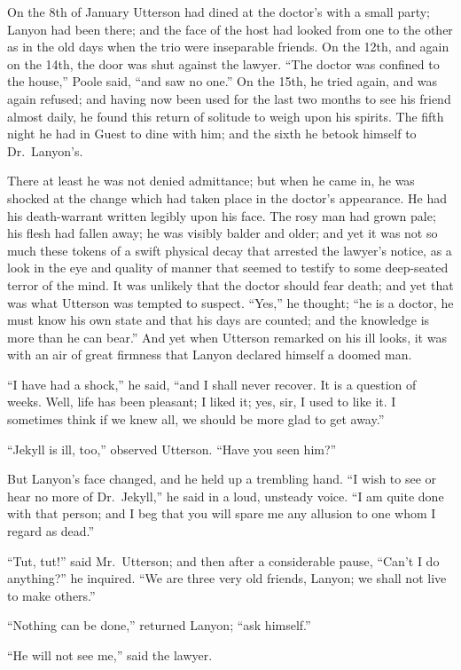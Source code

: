 \documentclass[12pt,openright]{book}
\begin{document}
On the 8th of January Utterson had dined at the doctor’s with a small party; Lanyon had been there; and the face of the host had looked from one to the other as in the old days when the trio were inseparable friends. On the 12th, and again on the 14th, the door was shut against the lawyer. “The doctor was confined to the house,” Poole said, “and saw no one.” On the 15th, he tried again, and was again refused; and having now been used for the last two months to see his friend almost daily, he found this return of solitude to weigh upon his spirits. The fifth night he had in Guest to dine with him; and the sixth he betook himself to Dr. Lanyon’s.

There at least he was not denied admittance; but when he came in, he was shocked at the change which had taken place in the doctor’s appearance. He had his death-warrant written legibly upon his face. The rosy man had grown pale; his flesh had fallen away; he was visibly balder and older; and yet it was not so much these tokens of a swift physical decay that arrested the lawyer’s notice, as a look in the eye and quality of manner that seemed to testify to some deep-seated terror of the mind. It was unlikely that the doctor should fear death; and yet that was what Utterson was tempted to suspect. “Yes,” he thought; “he is a doctor, he must know his own state and that his days are counted; and the knowledge is more than he can bear.” And yet when Utterson remarked on his ill looks, it was with an air of great firmness that Lanyon declared himself a doomed man.

“I have had a shock,” he said, “and I shall never recover. It is a question of weeks. Well, life has been pleasant; I liked it; yes, sir, I used to like it. I sometimes think if we knew all, we should be more glad to get away.”

“Jekyll is ill, too,” observed Utterson. “Have you seen him?”

But Lanyon’s face changed, and he held up a trembling hand. “I wish to see or hear no more of Dr. Jekyll,” he said in a loud, unsteady voice. “I am quite done with that person; and I beg that you will spare me any allusion to one whom I regard as dead.”

“Tut, tut!” said Mr. Utterson; and then after a considerable pause, “Can’t I do anything?” he inquired. “We are three very old friends, Lanyon; we shall not live to make others.”

“Nothing can be done,” returned Lanyon; “ask himself.”

“He will not see me,” said the lawyer.
\end{document}
